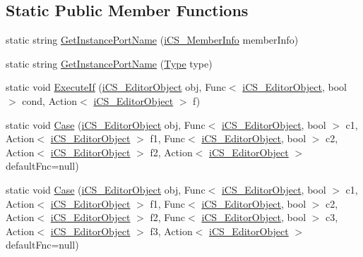 \subsection*{Static Public Member Functions}
\begin{DoxyCompactItemize}
\item 
static string \hyperlink{classi_c_s___i_storage_a2f220054e27c0acff69ab6dc771d5b65}{Get\+Instance\+Port\+Name} (\hyperlink{classi_c_s___member_info}{i\+C\+S\+\_\+\+Member\+Info} member\+Info)
\item 
static string \hyperlink{classi_c_s___i_storage_a7473caa02eeaaada8553baab06567004}{Get\+Instance\+Port\+Name} (\hyperlink{i_c_s___object_type_enum_8cs_ae6c3dd6d8597380b56d94908eb431547aa1fa27779242b4902f7ae3bdd5c6d508}{Type} type)
\item 
static void \hyperlink{classi_c_s___i_storage_a90d1cfec30921a5a46f395a72adee222}{Execute\+If} (\hyperlink{classi_c_s___editor_object}{i\+C\+S\+\_\+\+Editor\+Object} obj, Func$<$ \hyperlink{classi_c_s___editor_object}{i\+C\+S\+\_\+\+Editor\+Object}, bool $>$ cond, Action$<$ \hyperlink{classi_c_s___editor_object}{i\+C\+S\+\_\+\+Editor\+Object} $>$ f)
\item 
static void \hyperlink{classi_c_s___i_storage_a2393cc1d156e05a02531eea2c73940c8}{Case} (\hyperlink{classi_c_s___editor_object}{i\+C\+S\+\_\+\+Editor\+Object} obj, Func$<$ \hyperlink{classi_c_s___editor_object}{i\+C\+S\+\_\+\+Editor\+Object}, bool $>$ c1, Action$<$ \hyperlink{classi_c_s___editor_object}{i\+C\+S\+\_\+\+Editor\+Object} $>$ f1, Func$<$ \hyperlink{classi_c_s___editor_object}{i\+C\+S\+\_\+\+Editor\+Object}, bool $>$ c2, Action$<$ \hyperlink{classi_c_s___editor_object}{i\+C\+S\+\_\+\+Editor\+Object} $>$ f2, Action$<$ \hyperlink{classi_c_s___editor_object}{i\+C\+S\+\_\+\+Editor\+Object} $>$ default\+Fnc=null)
\item 
static void \hyperlink{classi_c_s___i_storage_a172a1c878d465769465c97675a16270e}{Case} (\hyperlink{classi_c_s___editor_object}{i\+C\+S\+\_\+\+Editor\+Object} obj, Func$<$ \hyperlink{classi_c_s___editor_object}{i\+C\+S\+\_\+\+Editor\+Object}, bool $>$ c1, Action$<$ \hyperlink{classi_c_s___editor_object}{i\+C\+S\+\_\+\+Editor\+Object} $>$ f1, Func$<$ \hyperlink{classi_c_s___editor_object}{i\+C\+S\+\_\+\+Editor\+Object}, bool $>$ c2, Action$<$ \hyperlink{classi_c_s___editor_object}{i\+C\+S\+\_\+\+Editor\+Object} $>$ f2, Func$<$ \hyperlink{classi_c_s___editor_object}{i\+C\+S\+\_\+\+Editor\+Object}, bool $>$ c3, Action$<$ \hyperlink{classi_c_s___editor_object}{i\+C\+S\+\_\+\+Editor\+Object} $>$ f3, Action$<$ \hyperlink{classi_c_s___editor_object}{i\+C\+S\+\_\+\+Editor\+Object} $>$ default\+Fnc=null)

\end{DoxyCompactItemize}
